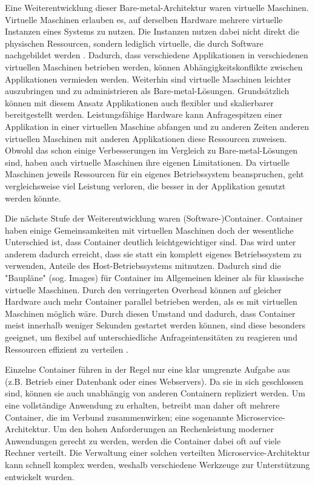 \documentclass[11pt,a4paper]{article}
\begin{document}
Eine Weiterentwicklung dieser Bare-metal-Architektur waren virtuelle Maschinen. Virtuelle Maschinen erlauben es, auf derselben Hardware mehrere virtuelle Instanzen eines
Systems zu nutzen. Die Instanzen nutzen dabei nicht direkt die physischen Ressourcen, sondern lediglich virtuelle, die durch Software nachgebildet werden \cite{kofler2021docker}.
Dadurch, dass verschiedene Applikationen in verschiedenen virtuellen Maschinen betrieben werden, können Abhängigkeitskonflikte zwischen Applikationen
vermieden werden. Weiterhin sind virtuelle Maschinen leichter auszubringen und zu administrieren als Bare-metal-Lösungen.
Grundsätzlich können mit diesem Ansatz Applikationen auch flexibler und skalierbarer bereitgestellt werden.
Leistungsfähige Hardware kann Anfragespitzen einer Applikation in einer virtuellen Maschine abfangen und zu anderen Zeiten anderen virtuellen Maschinen mit anderen
Applikationen diese Ressourcen zuweisen.
Obwohl das schon einige Verbesserungen im Vergleich zu Bare-metal-Lösungen sind, haben auch virtuelle Maschinen ihre eigenen Limitationen.
Da virtuelle Maschinen jeweils Ressourcen für ein eigenes Betriebssystem beanspruchen, geht vergleichsweise viel Leistung verloren, 
die besser in der Applikation genutzt werden könnte.

Die nächste Stufe der Weiterentwicklung waren (Software-)Container. Container haben einige Gemeinsamkeiten mit virtuellen Maschinen doch der wesentliche Unterschied ist,
dass Container deutlich leichtgewichtiger sind. Das wird unter anderem dadurch erreicht, dass sie statt ein komplett eigenes Betriebssystem zu verwenden, 
Anteile des Host-Betriebssystems mitnutzen. Dadurch sind die "Baupläne" (sog. Images) für Container im Allgemeinen kleiner als für klassische virtuelle Maschinen.
Durch den verringerten Overhead können auf gleicher Hardware auch mehr Container parallel betrieben werden, als es mit virtuellen Maschinen möglich wäre.
Durch diesen Umstand und dadurch, dass Container meist innerhalb weniger Sekunden gestartet werden können, sind diese besonders geeignet,
um flexibel auf unterschiedliche Anfrageintensitäten zu reagieren und Ressourcen effizient zu verteilen \cite{kofler2021docker}.

Einzelne Container führen in der Regel nur eine klar umgrenzte Aufgabe aus (z.B. Betrieb einer Datenbank oder eines Webservers). Da sie in sich geschlossen sind,
können sie auch unabhängig von anderen Containern repliziert werden. Um eine vollständige Anwendung zu erhalten, betreibt man daher oft mehrere Container,
die im Verbund zusammenwirken; eine sogenannte Microservice-Architektur. Um den hohen Anforderungen an Rechenleistung moderner Anwendungen gerecht zu werden,
werden die Container dabei oft auf viele Rechner verteilt.
Die Verwaltung einer solchen verteilten Microservice-Architektur kann schnell komplex werden, weshalb verschiedene Werkzeuge zur Unterstützung entwickelt wurden.
\end{document}
